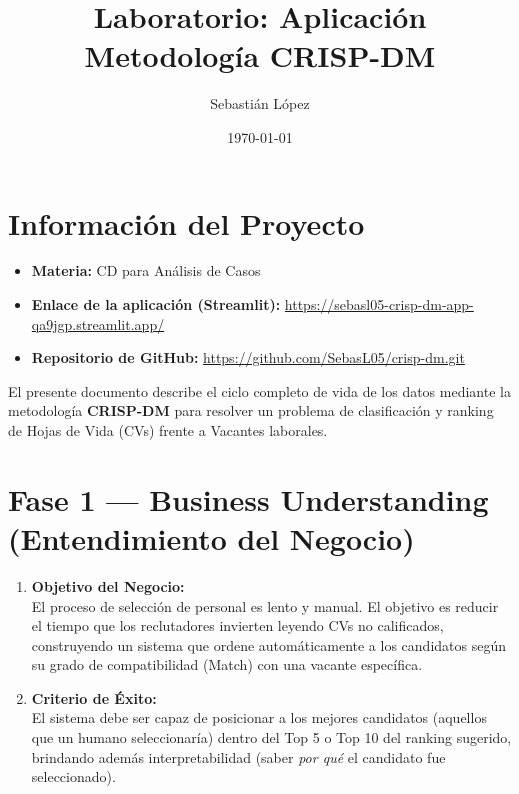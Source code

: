 \documentclass[11pt]{article}
\title{Laboratorio: Aplicación Metodología CRISP-DM}
\author{Sebastián López}
\affil{Pontificia Universidad Católica del Ecuador (PUCE)}
\date{\today}
\begin{document}
\maketitle

\section*{Información del Proyecto}

\begin{itemize}
    \item \textbf{Materia:} CD para Análisis de Casos
    \item \textbf{Enlace de la aplicación (Streamlit):} \url{https://sebasl05-crisp-dm-app-qa9jgp.streamlit.app/}
    \item \textbf{Repositorio de GitHub:} \url{https://github.com/SebasL05/crisp-dm.git}
\end{itemize}

\vspace{0.5cm}
El presente documento describe el ciclo completo de vida de los datos mediante la metodología \textbf{CRISP-DM} para resolver un problema de clasificación y ranking de Hojas de Vida (CVs) frente a Vacantes laborales.

\section*{Fase 1 — Business Understanding (Entendimiento del Negocio)}

\begin{enumerate}[label=\textbf{\arabic*.}]
    \item \textbf{Objetivo del Negocio:} \\
    El proceso de selección de personal es lento y manual. El objetivo es reducir el tiempo que los reclutadores invierten leyendo CVs no calificados, construyendo un sistema que ordene automáticamente a los candidatos según su grado de compatibilidad (Match) con una vacante específica.
    
    \item \textbf{Criterio de Éxito:} \\
    El sistema debe ser capaz de posicionar a los mejores candidatos (aquellos que un humano seleccionaría) dentro del Top 5 o Top 10 del ranking sugerido, brindando además interpretabilidad (saber \textit{por qué} el candidato fue seleccionado).
\end{enumerate}
\end{document}
